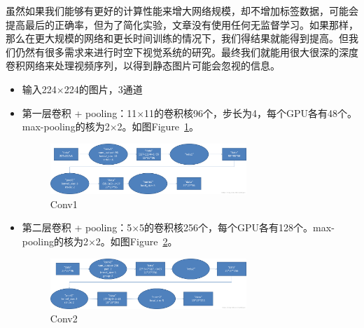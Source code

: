 \documentclass[12pt]{article}
\begin{document}
虽然如果我们能够有更好的计算性能来增大网络规模，却不增加标签数据，可能会提高最后的正确率，但为了简化实验，文章没有使用任何无监督学习。如果那样，那么在更大规模的网络和更长时间训练的情况下，我们得结果就能得到提高。但我们仍然有很多需求来进行时空下视觉系统的研究。最终我们就能用很大很深的深度卷积网络来处理视频序列，以得到静态图片可能会忽视的信息。

\begin{itemize}
\item 输入224$\times$224的图片，3通道
\item 第一层卷积 + pooling：11$\times$11的卷积核96个，步长为4，每个GPU各有48个。max-pooling的核为2$\times$2。如图Figure~\ref{fig:conv1}。
	\begin{figure}[!ht]
	\centering
	\includegraphics[width=0.7\textwidth]{conv1_1}
	\caption{Conv1}
	\label{fig:conv1}
	\end{figure}
\end{itemize}

\begin{itemize}
\item 第二层卷积 + pooling：5$\times$5的卷积核256个，每个GPU各有128个。max-pooling的核为2$\times$2。如图Figure~\ref{fig:conv2}。
	\begin{figure}[!ht]
	\centering
	\includegraphics[width=0.7\textwidth]{conv2_2}
	\caption{Conv2}
	\label{fig:conv2}
	\end{figure}
\end{itemize}
\end{document}
